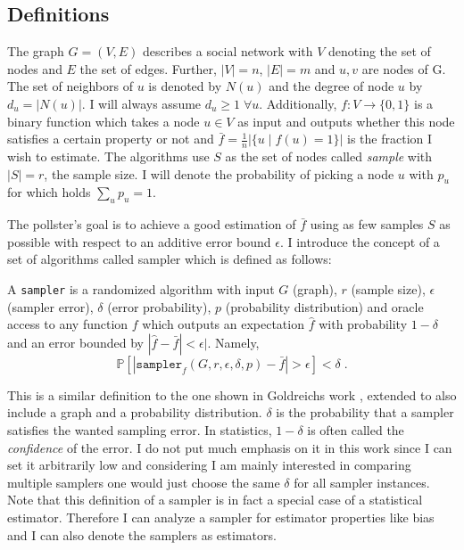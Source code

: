 \label{algorithms}
\subsection{Definitions}
The graph $G = (V,E)$ describes a social network with $V$ denoting the set of nodes and $E$ the set of edges. Further, $|V| = n$, $|E| = m$ and $u,v$ are nodes of G. The set of neighbors of $u$ is denoted by $N(u)$ and the degree of node $u$ by $d_u=|N(u)|$. I will always assume $d_u\geq1\;\forall u$. Additionally, $f : V \rightarrow \{0,1\}$ is a binary function which takes a node $u \in V$ as input and outputs whether this node satisfies a certain property or not and $\bar{f} = \frac{1}{n}|\{u\;|\;f(u) = 1\}|$ is the fraction I wish to estimate.
The algorithms use $S$ as the set of nodes called \textit{sample} with $|S| = r$, the sample size.
I will denote the probability of picking a node $u$ with $p_u$ for which holds $\sum_up_u = 1$.

The pollster's goal is to achieve a good estimation of $\bar{f}$ using as few samples $S$ as possible with respect to an additive error bound $\epsilon$.
I introduce the concept of a set of algorithms called sampler which is defined as follows:
\begin{definition}[sampler]
\label{defsampler}
  A \texttt{sampler} is a randomized algorithm with input $G$ (graph), $r$ (sample size), $\epsilon$ (sampler error), $\delta$ (error probability), $p$ (probability distribution) and oracle access to any function $f$ which outputs an expectation $\hat{f}$ with probability $1-\delta$ and an error bounded by $|\hat{f}-\bar{f}|<\epsilon|$. Namely,
  $$\mathds{P}[|\texttt{sampler}_f(G, r,\epsilon,\delta,p)-\bar{f} | > \epsilon] < \delta \;.$$
\end{definition}
This is a similar definition to the one shown in Goldreichs work \cite{goldreich1997sample}, extended to also include a graph and a probability distribution. 
$\delta$ is the probability that a sampler satisfies the wanted sampling error. In statistics, $1-\delta$ is often called the \textit{confidence} of the error. I do not put much emphasis on it in this work since I can set it arbitrarily low and considering I am mainly interested in comparing multiple samplers one would just choose the same $\delta$ for all sampler instances.
Note that this definition of a sampler is in fact a special case of a statistical estimator.
Therefore I can analyze a sampler for estimator properties like bias and I can also denote the samplers as estimators.


